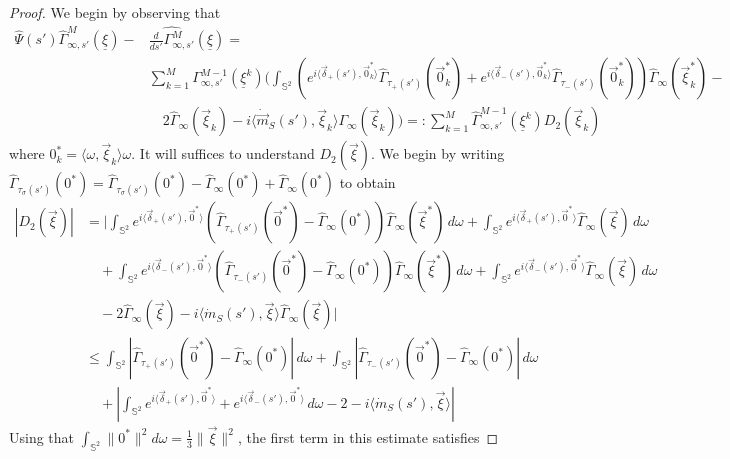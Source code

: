 \documentclass{article}
\newcommand\uxi{{\underline \xi}}
\newcommand\vxi{{\vec \xi}}
\begin{document}
\begin{proof}
We begin by observing that
\begin{align*}
\widehat\Psi(s') \widehat\Gamma^M_{\infty,s'}(\uxi) - &\widehat{\frac{d}{ds'}\Gamma^M_{\infty,s'}}(\uxi) =\\
& \sum_{k=1}^M \Gamma_{\infty,s'}^{M - 1}(\uxi^k) 
\bigg(\int_{\mathds S^2}\left(e^{i\langle\vec \delta_+(s'),\vec 0^*_k\rangle}\widehat \Gamma_{\tau_+(s')}(\vec
0^*_k)+e^{i\langle\vec \delta_-(s'),\vec 0^*_k\rangle}\widehat \Gamma_{\tau_-(s')}(\vec
0^*_k)\right)\widehat \Gamma_\infty(\vxi_k^*) -
\\ 
&\quad 2\widehat \Gamma_\infty(\vxi_k) - i\langle \dot{\vec m}_S(s'), \vxi_k\rangle \Gamma_\infty(\vxi_k)\bigg) =: 
\sum_{k=1}^M \widehat\Gamma_{\infty,s'}^{M - 1}(\uxi^k) D_2(\vxi_k)
\end{align*}
where $0^*_k=\langle\omega,\vxi_k\rangle\omega$.
It will suffices to understand $D_2(\vxi)$.
We begin by writing $\widehat \Gamma_{\tau_\sigma(s')}(0^*) = \widehat \Gamma_{\tau_\sigma(s')}(0^*) - \widehat 
\Gamma_{\infty}(0^*) + \widehat \Gamma_{\infty}(0^*)$ to obtain
\begin{align*}
|D_2(\vxi)|&= \bigg|\int_{\mathds S^2} e^{i\langle\vec \delta_+(s'),\vec 0^*\rangle}( \widehat 
\Gamma_{\tau_+(s')}(\vec 0^*)  - \widehat \Gamma_{\infty}(0^*))
\widehat\Gamma_{\infty}(\vxi^*) \, d\omega 
 + 
\int_{\mathds S^2} e^{i\langle\vec \delta_+(s'),\vec 0^*\rangle}\widehat \Gamma_{\infty}(\vxi) \, d\omega
\\
&\quad +
\int_{\mathds S^2} e^{i\langle\vec \delta_-(s'),\vec 0^*\rangle}( \widehat \Gamma_{\tau_-(s')}(\vec 0^*)  - \widehat 
\Gamma_{\infty}(0^*))
\widehat\Gamma_{\infty}(\vxi^*) \, d\omega 
 + 
\int_{\mathds S^2} e^{i\langle\vec \delta_-(s'),\vec 0^*\rangle}\widehat \Gamma_{\infty}(\vxi) \, d\omega
\\
&\quad -
2\widehat \Gamma_\infty(\vxi) - i\langle \dot{m}_S(s'), \vxi\rangle \widehat\Gamma_\infty(\vxi) \bigg| 
\\
&\leq 
\int_{\mathds S^2} \left| \widehat \Gamma_{\tau_+(s')}(\vec 0^*)  - \widehat \Gamma_{\infty}(0^*)\right|
 \, d\omega + \int_{\mathds S^2} \left| \widehat \Gamma_{\tau_-(s')}(\vec 0^*)  - \widehat \Gamma_{\infty}(0^*)\right|
 \, d\omega
 \\
 &\quad + 
 \left|\int_{\mathds S^2} e^{i\langle\vec \delta_+(s'),\vec 0^*\rangle} + e^{i\langle\vec \delta_-(s'),\vec 0^*\rangle} 
 \, d\omega - 2 - i\langle \dot{m}_S(s'), \vxi\rangle \right|
\end{align*}
Using that $\int_{\mathds S^2}\|0^*\|^2d\omega=\frac13\|\vxi\|^2$, the first term in this estimate satisfies

\end{proof}
\end{document}
